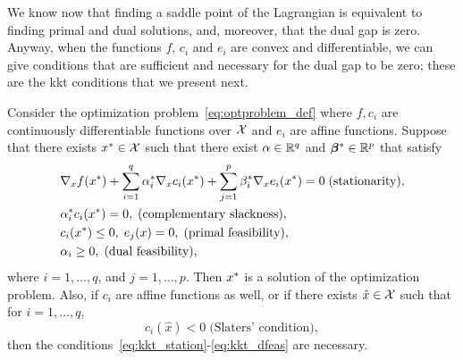 %
We know now that finding a saddle point of the Lagrangian is equivalent to finding primal and dual solutions, and, moreover, that the dual gap is zero.
Anyway, when the functions $f$, $c_i$ and $e_i$ are convex and differentiable, we can give conditions that are sufficient and necessary for the dual gap to be zero; these are the \acrshort{kkt} conditions that we present next.
\begin{theorem}\label{th:kkt_conditions}
    Consider the optimization problem~\eqref{eq:optproblem_def} where $f, c_i$ are continuously differentiable functions over $\mathcal{X}$ and $e_i$ are affine functions. Suppose that there exists ${x}^* \in \mathcal{X}$ such that there exist $\alpha \in \mathbb{R}^q$ and ${\bm{\beta}}^* \in \mathbb{R}^p$ that satisfy
    \begin{align}
        &\nabla_x f(\opt{x}) + \sum_{i=1}^q \opt{\alpha}_i \nabla_x c_i(\opt{x}) + \sum_{j=1}^p \opt{\beta}_i \nabla_x e_i(\opt{x}) = 0 \; \text{(stationarity)}, \label{eq:kkt_station} \\
        &\opt{\alpha}_i c_i(\opt{x}) = 0, \; \text{(complementary slackness)}, \label{eq:kkt_comp}\\
        &c_i(\opt{x}) \leq 0 , \; e_j(x) = 0, \; \text{(primal feasibility)}, \label{eq:kkt_pfeas}\\
        &\alpha_i \geq 0,\;  \text{(dual feasibility)} , \label{eq:kkt_dfeas}
    \end{align}  
    where $i=1, \ldots, q$, and $j=1, \ldots, p$. Then ${x}^*$ is a solution of the optimization problem.
    Also, if $c_i$ are affine functions as well, or if there exists $\hat{x} \in \mathcal{X}$ such that for $i=1, \ldots, q$, 
    \begin{equation}
        \nonumber
        c_i(\hat{x}) < 0 \; \text{(Slaters' condition)},
    \end{equation}
    then the conditions~\eqref{eq:kkt_station}-\eqref{eq:kkt_dfeas} are necessary.
\end{theorem}
